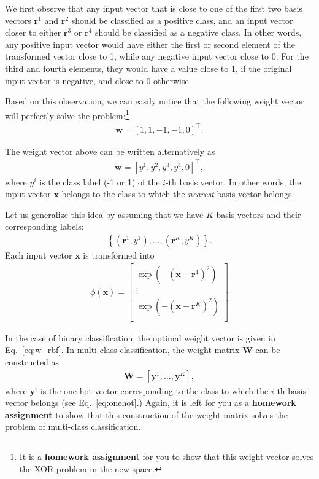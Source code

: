 \documentclass{report}
\newcommand{\vect}[1]{\mathbf{#1}}
\newcommand{\matr}[1]{\mathbf{#1}}
\newcommand{\vx}[0]{\vect{x}}
\newcommand{\vw}[0]{\vect{w}}
\newcommand{\vy}[0]{\vect{y}}
\newcommand{\vr}[0]{\vect{r}}
\newcommand{\mW}[0]{\matr{W}}
\begin{document}
We first observe that any input vector that is close to one of the first two
basis vectors $\vr^1$ and $\vr^2$ should be classified as a positive class, and
an input vector closer to either $\vr^3$ or $\vr^4$ should be classified as a
negative class. In other words, any positive input vector would have either the
first or second element of the transformed vector close to 1, while any negative
input vector close to 0. For the third and fourth elements, they would have a
value close to 1, if the original input vector is negative, and close to 0
otherwise. 

Based on this observation, we can easily notice that the following weight vector
will perfectly solve the problem:\footnote{
    It is a {\bf homework assignment} for you to show that this weight vector
    solves the XOR problem in the new space. 
}
\begin{align*}
    \vw = \left[ 1, 1, -1, -1, 0 \right]^\top.
\end{align*}

The weight vector above can be written alternatively as 
\begin{align}
    \label{eq:w_rbf}
    \vw = \left[ y^1, y^2, y^3, y^4, 0\right]^\top,
\end{align}
where $y^i$ is the class label (-1 or 1) of the $i$-th basis vector.
In other words, the input vector $\vx$ belongs to the class to which the {\it
nearest} basis vector belongs. 

Let us generalize this idea by assuming that we have $K$ basis vectors and their
corresponding labels:
\begin{align*}
    \left\{ (\vr^1, y^1), \ldots, (\vr^K, y^K) \right\}.
\end{align*}
Each input vector $\vx$ is transformed into
\begin{align}
    \label{eq:W_rbf}
    \phi(\vx) = \left[ 
        \begin{array}{c}
            \exp\left( -(\vx - \vr^1)^2 \right)  \\
            \vdots \\
            \exp\left( -(\vx - \vr^K)^2 \right)  \\
        \end{array}
    \right]
\end{align}

In the case of binary classification, the optimal weight vector is given in
Eq.~\eqref{eq:w_rbf}. In multi-class classification, the weight matrix $\mW$ can
be constructed as
\begin{align*}
    \mW = \left[
        \vy^1, \ldots, \vy^K
    \right],
\end{align*}
where $\vy^i$ is the one-hot vector corresponding to the class to which the
$i$-th basis vector belongs (see Eq.~\eqref{eq:onehot}.) Again, it is left for
you as a {\bf homework assignment} to show that this construction of the weight
matrix solves the problem of multi-class classification.
\end{document}
